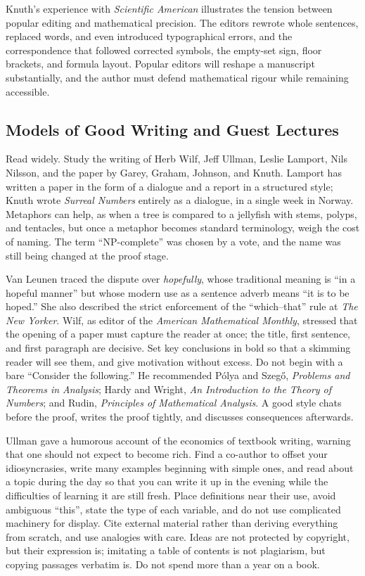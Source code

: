 \documentclass[11pt]{article}
\begin{document}
Knuth's experience with \emph{Scientific American} illustrates the tension between popular editing and mathematical precision. The editors rewrote whole sentences, replaced words, and even introduced typographical errors, and the correspondence that followed corrected symbols, the empty-set sign, floor brackets, and formula layout. Popular editors will reshape a manuscript substantially, and the author must defend mathematical rigour while remaining accessible.

\subsection{Models of Good Writing and Guest Lectures}

Read widely. Study the writing of Herb Wilf, Jeff Ullman, Leslie Lamport, Nils Nilsson, and the paper by Garey, Graham, Johnson, and Knuth. Lamport has written a paper in the form of a dialogue and a report in a structured style; Knuth wrote \emph{Surreal Numbers} entirely as a dialogue, in a single week in Norway. Metaphors can help, as when a tree is compared to a jellyfish with stems, polyps, and tentacles, but once a metaphor becomes standard terminology, weigh the cost of naming. The term ``NP-complete'' was chosen by a vote, and the name was still being changed at the proof stage.

Van Leunen traced the dispute over \emph{hopefully}, whose traditional meaning is ``in a hopeful manner'' but whose modern use as a sentence adverb means ``it is to be hoped.'' She also described the strict enforcement of the ``which--that'' rule at \emph{The New Yorker}. Wilf, as editor of the \emph{American Mathematical Monthly}, stressed that the opening of a paper must capture the reader at once; the title, first sentence, and first paragraph are decisive. Set key conclusions in bold so that a skimming reader will see them, and give motivation without excess. Do not begin with a bare ``Consider the following.'' He recommended P\'olya and Szeg\H{o}, \emph{Problems and Theorems in Analysis}; Hardy and Wright, \emph{An Introduction to the Theory of Numbers}; and Rudin, \emph{Principles of Mathematical Analysis}. A good style chats before the proof, writes the proof tightly, and discusses consequences afterwards.

Ullman gave a humorous account of the economics of textbook writing, warning that one should not expect to become rich. Find a co-author to offset your idiosyncrasies, write many examples beginning with simple ones, and read about a topic during the day so that you can write it up in the evening while the difficulties of learning it are still fresh. Place definitions near their use, avoid ambiguous ``this'', state the type of each variable, and do not use complicated machinery for display. Cite external material rather than deriving everything from scratch, and use analogies with care. Ideas are not protected by copyright, but their expression is; imitating a table of contents is not plagiarism, but copying passages verbatim is. Do not spend more than a year on a book.
\end{document}
